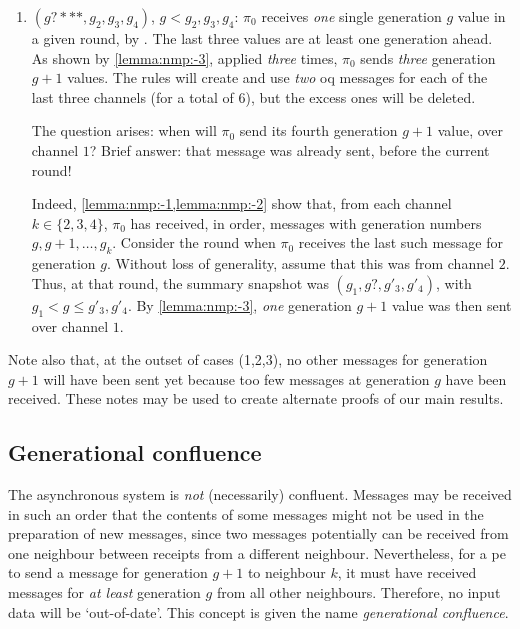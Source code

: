 \begin{remark}
\begin{enumerate}
    \medskip
    \item $(g?***, g_2, g_3, g_4)$, $g < g_2, g_3, g_4$: 
    $\pi_0$ receives \emph{one} single generation $g$ value in a given round, by .
    The last three values are at least one generation ahead.
    As shown by \cref{lemma:nmp:-3}, applied \emph{three} times, 
    $\pi_0$ sends \emph{three} generation $g+1$ values.
    The rules will create and use \emph{two} \gls{oq} messages for each of the last three channels (for a total of 6), but the excess ones will be deleted.
    
    \medskip
    The question arises: when will $\pi_0$ send its fourth generation $g+1$ value, over channel $1$? Brief answer: that message was already sent,
    before the current round!
    
    \medskip
    Indeed, \cref{lemma:nmp:-1,lemma:nmp:-2} show that,
    from each channel $k \in \{ 2, 3, 4\}$, 
    $\pi_0$ has received, in order, 
    messages with generation numbers $g, g+1, \ldots, g_k$.
    Consider the round when $\pi_0$ receives the last such message for generation $g$. Without loss of generality, assume that this was from channel $2$.
    Thus, at that round, the summary snapshot was $(g_1, g?, g'_3, g'_4)$,
    with $g_1 < g \leq g'_3, g'_4$.
    By \cref{lemma:nmp:-3}, \emph{one} generation $g+1$ value was then sent over channel $1$.
    \end{enumerate}    
    
    Note also that, at the outset of cases (1,2,3), no other messages for generation $g+1$ will have been sent yet because too few messages at generation $g$ have been received. 
    These notes may be used to create alternate proofs of our main results.

\end{remark}

\subsection{Generational confluence}
The asynchronous system is \emph{not} (necessarily) confluent.  Messages may be received in such an order that the contents of some messages might not be used in the preparation of new messages, since two messages potentially can be received from one neighbour between receipts from a different neighbour.  Nevertheless, for a \gls{pe} to send a message for generation \(g + 1\) to neighbour \(k\), it must have received messages for \emph{at least} generation \(g\) from all other neighbours.  Therefore, no input data will be `out-of-date'.  This concept is given the name \emph{generational confluence}.

